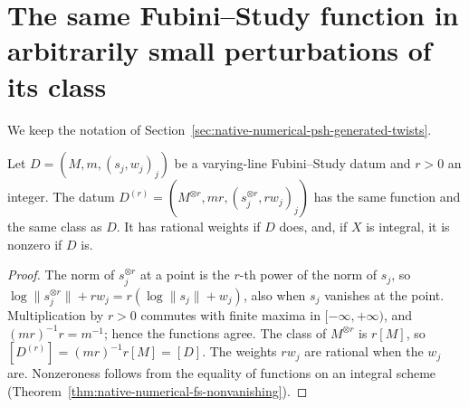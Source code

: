 \section{The same Fubini--Study function in arbitrarily small perturbations of its class}
\label{sec:native-numerical-psh-power-perturbations}

We keep the notation of Section~\ref{sec:native-numerical-psh-generated-twists}.

\begin{lemma}
\label{lem:native-numerical-fs-power-datum}
\leanok
{}
Let $D=(M,m,(s_j,w_j)_j)$ be a varying-line Fubini--Study datum and $r>0$ an
integer.  The datum $D^{(r)}=(M^{\otimes r},mr,(s_j^{\otimes r},rw_j)_j)$ has
the same function and the same class as $D$.  It has rational weights if $D$
does, and, if $X$ is integral, it is nonzero if $D$ is.
\end{lemma}
\begin{proof}
The norm of $s_j^{\otimes r}$ at a point is the $r$-th power of the norm of
$s_j$, so $\log\lVert s_j^{\otimes r}\rVert+rw_j=r(\log\lVert s_j\rVert+w_j)$,
also when $s_j$ vanishes at the point.  Multiplication by $r>0$ commutes
with finite maxima in $[-\infty,+\infty)$, and $(mr)^{-1}r=m^{-1}$; hence
the functions agree.  The class of $M^{\otimes r}$ is $r[M]$, so
$[D^{(r)}]=(mr)^{-1}r[M]=[D]$.  The weights $rw_j$ are rational when the
$w_j$ are.  Nonzeroness follows from the equality of functions on an
integral scheme (Theorem~\ref{thm:native-numerical-fs-nonvanishing}).
\end{proof}

